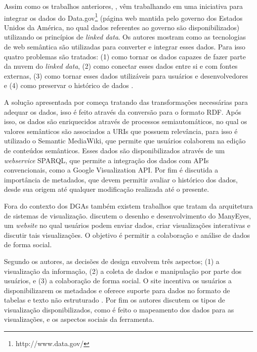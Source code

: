 Assim como os trabalhos anteriores, , vêm trabalhando em uma 
iniciativa para integrar os dados do Data.gov\footnote{ http://www.data.gov/} (página web 
mantida pelo governo dos Estados Unidos da América, no qual dados referentes ao governo são 
disponibilizados) utilizando os princípios de \textit{linked data}. Os autores mostram como 
as tecnologias de web semântica são utilizadas para converter e integrar esses dados. Para 
isso quatro problemas são tratados: (1) como tornar os dados capazes de fazer parte da 
nuvem do \textit{linked data}, (2) como conectar esses dados entre si e com fontes externas, 
(3) como tornar esses dados utilizáveis para usuários e desenvolvedores e (4) como preservar 
o histórico de dados \cite{ding2010data}.

A solução apresentada por  começa tratando das transformações 
necessárias para adequar os dados, isso é feito através da conversão para o formato RDF. 
Após isso, os dados são enriquecidos através de processos semiautomáticos, no qual os valores 
semânticos são associados a URIs que possuem relevância, para isso é utilizado o Semantic 
MediaWiki, que permite que usuários colaborem na edição de conteúdos semânticos. Esses dados 
são disponibilizados através de um \textit{webservice} SPARQL, que permite a integração dos 
dados com APIs convencionais, como a Google Visualization API. Por fim é discutida a 
importância de metadados, que devem permitir avaliar o histórico dos dados, desde sua origem 
até qualquer modificação realizada até o presente.

Fora do contexto dos DGAs também existem trabalhos que tratam da arquitetura de sistemas de 
visualização.  discutem o desenho e desenvolvimento do ManyEyes, um 
\textit{website} no qual usuários podem enviar dados, criar visualizações interativas e 
discutir tais visualizações. O objetivo é permitir a colaboração e análise de dados de forma 
social.

Segundo os autores, as decisões de design envolvem três aspectos; (1) a visualização da 
informação, (2) a coleta de dados e manipulação por parte dos usuários, e (3) a colaboração 
de forma social. O site incentiva os usuários a disponibilizarem os metadados e oferece 
suporte para dados no formato de tabelas e texto não estruturado \cite{viegas2007}. 
Por fim os autores discutem os tipos de visualização disponibilizados, como é feito o 
mapeamento dos dados para as visualizações, e os aspectos sociais da ferramenta.


